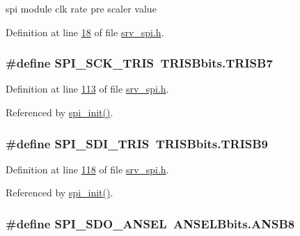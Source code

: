 spi module clk rate pre scaler value 



Definition at line \hyperlink{a00007_source_l00018}{18} of file \hyperlink{a00007_source}{srv\+\_\+spi.\+h}.

\hypertarget{a00007_a98c4bd0ee0f76eb205e874355bf9cd33}{
\subsubsection[{S\+P\+I\+\_\+\+S\+C\+K\+\_\+\+T\+R\+I\+S}]{\setlength{\rightskip}{0pt plus 5cm}\#define S\+P\+I\+\_\+\+S\+C\+K\+\_\+\+T\+R\+I\+S~T\+R\+I\+S\+Bbits.\+T\+R\+I\+S\+B7}}\label{a00007_a98c4bd0ee0f76eb205e874355bf9cd33}


Definition at line \hyperlink{a00007_source_l00113}{113} of file \hyperlink{a00007_source}{srv\+\_\+spi.\+h}.



Referenced by \hyperlink{a00026_source_l00030}{spi\+\_\+init()}.

\hypertarget{a00007_a40c85fd42ffb12b326b7cb9ee48f2ffb}{
\subsubsection[{S\+P\+I\+\_\+\+S\+D\+I\+\_\+\+T\+R\+I\+S}]{\setlength{\rightskip}{0pt plus 5cm}\#define S\+P\+I\+\_\+\+S\+D\+I\+\_\+\+T\+R\+I\+S~T\+R\+I\+S\+Bbits.\+T\+R\+I\+S\+B9}}\label{a00007_a40c85fd42ffb12b326b7cb9ee48f2ffb}


Definition at line \hyperlink{a00007_source_l00118}{118} of file \hyperlink{a00007_source}{srv\+\_\+spi.\+h}.



Referenced by \hyperlink{a00026_source_l00030}{spi\+\_\+init()}.

\hypertarget{a00007_a11571727bdbc21b0bfb7c701599e759b}{
\subsubsection[{S\+P\+I\+\_\+\+S\+D\+O\+\_\+\+A\+N\+S\+E\+L}]{\setlength{\rightskip}{0pt plus 5cm}\#define S\+P\+I\+\_\+\+S\+D\+O\+\_\+\+A\+N\+S\+E\+L~A\+N\+S\+E\+L\+Bbits.\+A\+N\+S\+B8}}\label{a00007_a11571727bdbc21b0bfb7c701599e759b}


